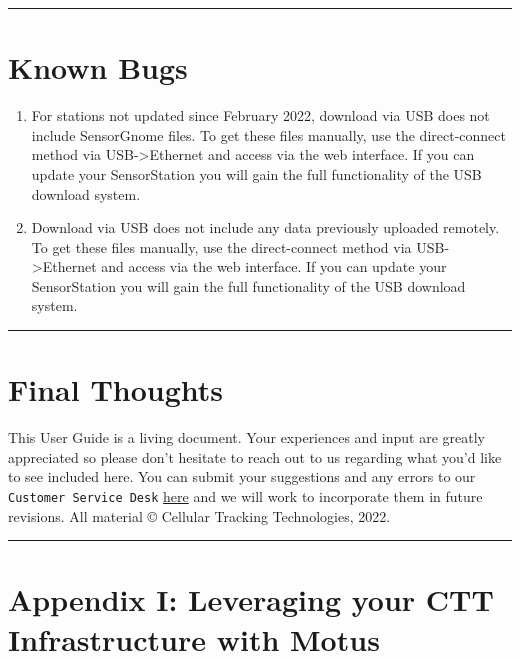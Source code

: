 \documentclass[
]{article}
\providecommand{\tightlist}{%
  \setlength{\itemsep}{0pt}\setlength{\parskip}{0pt}}
\begin{document}
\begin{center}\rule{0.5\linewidth}{0.5pt}\end{center}

\hypertarget{known-bugs}{%
\section{Known Bugs}\label{known-bugs}}

\begin{enumerate}
\def\labelenumi{\arabic{enumi}.}
\tightlist
\item
  For stations not updated since February 2022, download via USB does
  not include SensorGnome files. To get these files manually, use the
  direct-connect method via USB-\textgreater Ethernet and access via the
  web interface. If you can update your SensorStation you will gain the
  full functionality of the USB download system.
\item
  Download via USB does not include any data previously uploaded
  remotely. To get these files manually, use the direct-connect method
  via USB-\textgreater Ethernet and access via the web interface. If you
  can update your SensorStation you will gain the full functionality of
  the USB download system.
\end{enumerate}

\begin{center}\rule{0.5\linewidth}{0.5pt}\end{center}

\hypertarget{final-thoughts}{%
\section{Final Thoughts}\label{final-thoughts}}

This User Guide is a living document. Your experiences and input are
greatly appreciated so please don't hesitate to reach out to us
regarding what you'd like to see included here. You can submit your
suggestions and any errors to our \texttt{Customer\ Service\ Desk}
\href{https://celltracktech.com/support-customer-service-desk/}{here}
and we will work to incorporate them in future revisions. All material ©
Cellular Tracking Technologies, 2022.

\begin{center}\rule{0.5\linewidth}{0.5pt}\end{center}

\hypertarget{appendix_1}{%
\section{Appendix I: Leveraging your CTT Infrastructure with
Motus}\label{appendix_1}}
\end{document}
